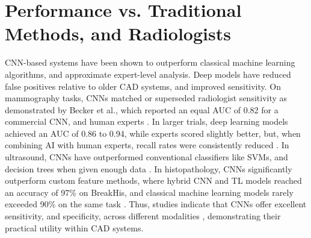 \documentclass[../main]{subfiles}
\begin{document}
\section{Performance vs. Traditional Methods, and Radiologists}
\label{sec:performance}
CNN-based systems have been shown to outperform classical machine learning algorithms, and approximate expert-level analysis. Deep models have reduced false positives relative to older CAD systems, and improved sensitivity. On mammography tasks, CNNs matched or superseded radiologist sensitivity as demonstrated by Becker et al., which reported an equal AUC of 0.82 for a commercial CNN, and human experts \autocite{carriero2024deep}. In larger trials, deep learning models achieved an AUC of 0.86 to 0.94, while experts scored slightly better, but, when combining AI with human experts, recall rates were consistently reduced \autocite{carriero2024deep}. In ultrasound, CNNs have outperformed conventional classifiers like SVMs, and decision trees when given enough data \autocite{yusoff2023accuracy}. In histopathology, CNNs significantly outperform custom feature methods, where hybrid CNN and TL models reached an accuracy of 97\% on BreakHis, and classical machine learning models rarely exceeded 90\% on the same task \autocite{yusoff2023accuracy}. Thus, studies indicate that CNNs offer excellent sensitivity, and specificity, across different modalities \autocite{carriero2024deep} \autocite{wang2024mammography}, demonstrating their practical utility within CAD systems.
\end{document}
